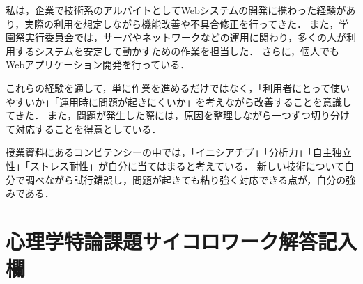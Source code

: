 \documentclass[titlepage,a4paper]{jsarticle}
\begin{document}
私は，企業で技術系のアルバイトとしてWebシステムの開発に携わった経験があり，実際の利用を想定しながら機能改善や不具合修正を行ってきた．
また，学園祭実行委員会では，サーバやネットワークなどの運用に関わり，多くの人が利用するシステムを安定して動かすための作業を担当した．
さらに，個人でもWebアプリケーション開発を行っている．

これらの経験を通して，単に作業を進めるだけではなく，「利用者にとって使いやすいか」「運用時に問題が起きにくいか」を考えながら改善することを意識してきた．
また，問題が発生した際には，原因を整理しながら一つずつ切り分けて対応することを得意としている．

授業資料にあるコンピテンシーの中では，「イニシアチブ」「分析力」「自主独立性」「ストレス耐性」が自分に当てはまると考えている．
新しい技術について自分で調べながら試行錯誤し，問題が起きても粘り強く対応できる点が，自分の強みである．

\section{心理学特論課題サイコロワーク解答記入欄}
\end{document}
